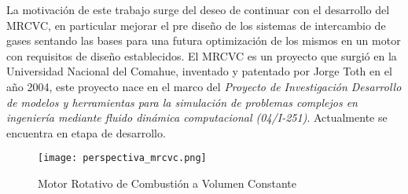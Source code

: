 La motivación de este trabajo surge del deseo de continuar con el desarrollo
del MRCVC, en particular mejorar el pre diseño de los sistemas de intercambio de
gases sentando las bases para una futura optimización de los mismos en un motor
con requisitos de diseño establecidos.
%
El MRCVC es un proyecto que surgió en la Universidad Nacional del Comahue,
inventado y patentado por Jorge Toth\cite{toth} en el año 2004, este proyecto
nace en el marco del \emph{Proyecto de Investigación Desarrollo de modelos y
    herramientas para la simulación de problemas complejos en ingeniería
mediante fluido dinámica computacional (04/I-251)}. Actualmente se encuentra en
etapa de desarrollo.

\begin{figure}[h!]
    \centering
    \texttt{[image: perspectiva\_mrcvc.png]}
    \caption{Motor Rotativo de Combustión a Volumen Constante}
    \label{fig:mrcvc}
\end{figure}
